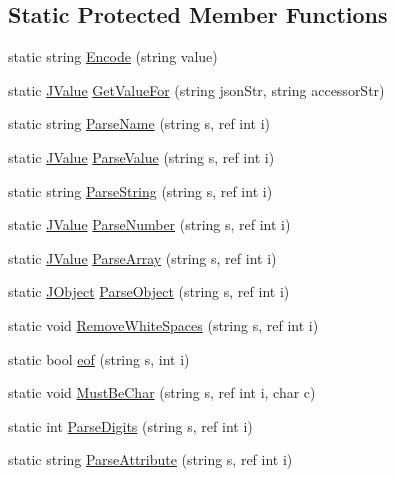 \subsection*{Static Protected Member Functions}
\begin{DoxyCompactItemize}
\item 
static string \hyperlink{class_disruptive_software_1_1_j_s_o_n_af2739c3fd70ec4a9248afda8c3e703b6}{Encode} (string value)
\item 
static \hyperlink{class_disruptive_software_1_1_j_value}{J\+Value} \hyperlink{class_disruptive_software_1_1_j_s_o_n_a016b511792709154ab1e49ccfaa8d1e6}{Get\+Value\+For} (string json\+Str, string accessor\+Str)
\item 
static string \hyperlink{class_disruptive_software_1_1_j_s_o_n_ad9290f8372419d3ccd7096e20c0e357b}{Parse\+Name} (string s, ref int i)
\item 
static \hyperlink{class_disruptive_software_1_1_j_value}{J\+Value} \hyperlink{class_disruptive_software_1_1_j_s_o_n_af1a7665ce4880446de781d82078110de}{Parse\+Value} (string s, ref int i)
\item 
static string \hyperlink{class_disruptive_software_1_1_j_s_o_n_a172285ec55156a5516d75d55af0fa10e}{Parse\+String} (string s, ref int i)
\item 
static \hyperlink{class_disruptive_software_1_1_j_value}{J\+Value} \hyperlink{class_disruptive_software_1_1_j_s_o_n_ae76e087da5fdccb60e0680146b54898b}{Parse\+Number} (string s, ref int i)
\item 
static \hyperlink{class_disruptive_software_1_1_j_value}{J\+Value} \hyperlink{class_disruptive_software_1_1_j_s_o_n_af9b79de5d140e13cc6aed37fb8a0cc2b}{Parse\+Array} (string s, ref int i)
\item 
static \hyperlink{class_disruptive_software_1_1_j_object}{J\+Object} \hyperlink{class_disruptive_software_1_1_j_s_o_n_a95e5bde5d047edd0e3a1145d12b48218}{Parse\+Object} (string s, ref int i)
\item 
static void \hyperlink{class_disruptive_software_1_1_j_s_o_n_aaa320c7d99de49f4c71f4a393cef34bf}{Remove\+White\+Spaces} (string s, ref int i)
\item 
static bool \hyperlink{class_disruptive_software_1_1_j_s_o_n_aca6f0aa4444e8114e9180b656c6cd25a}{eof} (string s, int i)
\item 
static void \hyperlink{class_disruptive_software_1_1_j_s_o_n_a41aae3d81eed5c4e686200f96e1a6421}{Must\+Be\+Char} (string s, ref int i, char c)
\item 
static int \hyperlink{class_disruptive_software_1_1_j_s_o_n_afe05c2afb5ce2c87116cd5da46cfca09}{Parse\+Digits} (string s, ref int i)
\item 
static string \hyperlink{class_disruptive_software_1_1_j_s_o_n_a59a164291e8bccfd648a40f1ea1324a3}{Parse\+Attribute} (string s, ref int i)
\end{DoxyCompactItemize}


